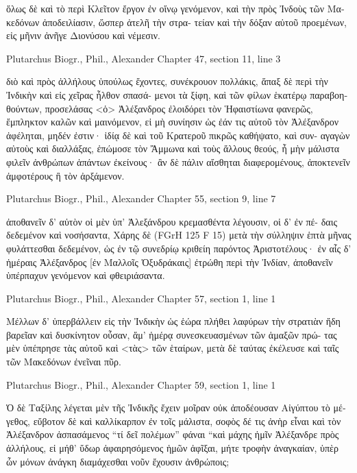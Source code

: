 \documentclass[12pt,letterpaper,twoside,final]{memoir}
\begin{document}
\begin{greek}
                                       ὅλως δὲ καὶ τὸ περὶ 
Κλεῖτον ἔργον ἐν οἴνῳ γενόμενον, καὶ τὴν πρὸς Ἰνδοὺς 
τῶν Μακεδόνων ἀποδειλίασιν, ὥσπερ ἀτελῆ τὴν στρα-
τείαν καὶ τὴν δόξαν αὐτοῦ προεμένων, εἰς μῆνιν ἀνῆγε   
Διονύσου καὶ νέμεσιν. 



Plutarchus Biogr., Phil., Alexander 
Chapter 47, section 11, line 3

                                                          διὸ 
καὶ πρὸς ἀλλήλους ὑπούλως ἔχοντες, συνέκρουον πολλάκις, 
ἅπαξ δὲ περὶ τὴν Ἰνδικὴν καὶ εἰς χεῖρας ἦλθον σπασά-
μενοι τὰ ξίφη, καὶ τῶν φίλων ἑκατέρῳ παραβοηθούντων, 
προσελάσας <ὁ> Ἀλέξανδρος ἐλοιδόρει τὸν Ἡφαιστίωνα   
φανερῶς, ἔμπληκτον καλῶν καὶ μαινόμενον, εἰ μὴ συνίησιν 
ὡς ἐάν τις αὐτοῦ τὸν Ἀλέξανδρον ἀφέληται, μηδέν ἐστιν· 
ἰδίᾳ δὲ καὶ τοῦ Κρατεροῦ πικρῶς καθήψατο, καὶ συν-
αγαγὼν αὐτοὺς καὶ διαλλάξας, ἐπώμοσε τὸν Ἄμμωνα καὶ 
τοὺς ἄλλους θεούς, ἦ μὴν μάλιστα φιλεῖν ἀνθρώπων 
ἁπάντων ἐκείνους· ἂν δὲ πάλιν αἴσθηται διαφερομένους, 
ἀποκτενεῖν ἀμφοτέρους ἢ τὸν ἀρξάμενον. 



Plutarchus Biogr., Phil., Alexander 
Chapter 55, section 9, line 7

                                     ἀποθανεῖν δ' αὐτὸν οἱ 
μὲν ὑπ' Ἀλεξάνδρου κρεμασθέντα λέγουσιν, οἱ δ' ἐν πέ-
δαις δεδεμένον καὶ νοσήσαντα, Χάρης δὲ (FGrH 125 F 15) 
μετὰ τὴν σύλληψιν ἑπτὰ μῆνας φυλάττεσθαι δεδεμένον, 
ὡς ἐν τῷ συνεδρίῳ κριθείη παρόντος Ἀριστοτέλους· ἐν 
αἷς δ' ἡμέραις Ἀλέξανδρος [ἐν Μαλλοῖς Ὀξυδράκαις]   
ἐτρώθη περὶ τὴν Ἰνδίαν, ἀποθανεῖν ὑπέρπαχυν γενόμενον 
καὶ φθειριάσαντα. 



Plutarchus Biogr., Phil., Alexander 
Chapter 57, section 1, line 1

Μέλλων δ' ὑπερβάλλειν εἰς τὴν Ἰνδικὴν ὡς ἑώρα 
πλήθει λαφύρων τὴν στρατιὰν ἤδη βαρεῖαν καὶ δυσκίνητον 
οὖσαν, ἅμ' ἡμέρᾳ συνεσκευασμένων τῶν ἁμαξῶν πρώ-
τας μὲν ὑπέπρησε τὰς αὑτοῦ καὶ <τὰς> τῶν ἑταίρων, 
μετὰ δὲ ταύτας ἐκέλευσε καὶ ταῖς τῶν Μακεδόνων 
ἐνεῖναι πῦρ. 



Plutarchus Biogr., Phil., Alexander 
Chapter 59, section 1, line 1

Ὁ δὲ Ταξίλης λέγεται μὲν τῆς Ἰνδικῆς ἔχειν μοῖραν 
οὐκ ἀποδέουσαν Αἰγύπτου τὸ μέγεθος, εὔβοτον δὲ καὶ 
καλλίκαρπον ἐν τοῖς μάλιστα, σοφὸς δέ τις ἀνὴρ εἶναι 
καὶ τὸν Ἀλέξανδρον ἀσπασάμενος “τί δεῖ πολέμων” 
φάναι “καὶ μάχης ἡμῖν Ἀλέξανδρε πρὸς ἀλλήλους, εἰ 
μήθ' ὕδωρ ἀφαιρησόμενος ἡμῶν ἀφῖξαι, μήτε τροφὴν 
ἀναγκαίαν, ὑπὲρ ὧν μόνων ἀνάγκη διαμάχεσθαι νοῦν 
ἔχουσιν ἀνθρώποις; 




\end{greek}
\end{document}

